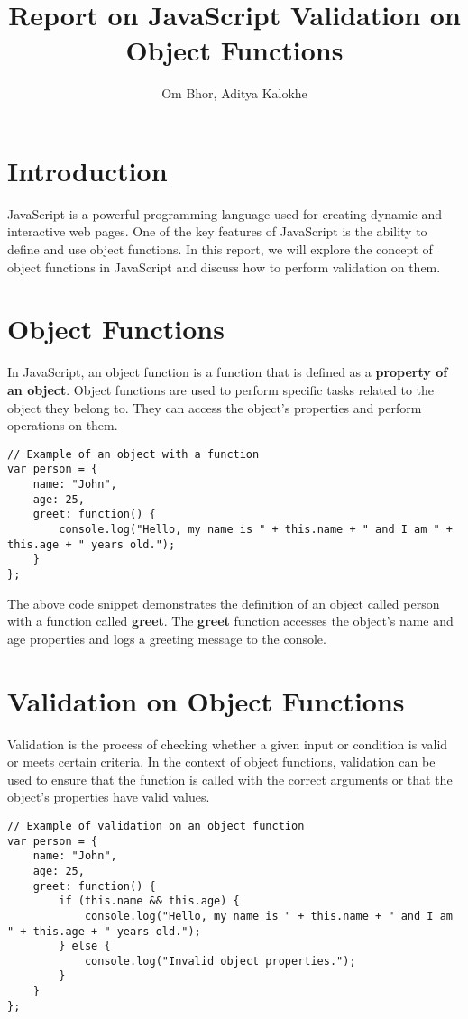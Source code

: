 \documentclass{article}
\title{Report on JavaScript Validation on Object Functions}
\author{Om Bhor, Aditya Kalokhe}
\begin{document}
\maketitle

\section{Introduction}
JavaScript is a powerful programming language used for creating dynamic and interactive web pages. One of the key features of JavaScript is the ability to define and use object functions. In this report, we will explore the concept of object functions in JavaScript and discuss how to perform validation on them.

\section{Object Functions}

In JavaScript, an object function is a function that is defined as a \textbf{property of an object}. Object functions are used to perform specific tasks related to the object they belong to. They can access the object's properties and perform operations on them.

\begin{lstlisting}
// Example of an object with a function
var person = {
    name: "John",
    age: 25,
    greet: function() {
        console.log("Hello, my name is " + this.name + " and I am " + this.age + " years old.");
    }
};
\end{lstlisting}

The above code snippet demonstrates the definition of an object called person with a function called \textbf{greet}. The \textbf{greet} function accesses the object's name and age properties and logs a greeting message to the console.

\section{Validation on Object Functions}

Validation is the process of checking whether a given input or condition is valid or meets certain criteria. In the context of object functions, validation can be used to ensure that the function is called with the correct arguments or that the object's properties have valid values.

\begin{lstlisting}
// Example of validation on an object function
var person = {
    name: "John",
    age: 25,
    greet: function() {
        if (this.name && this.age) {
            console.log("Hello, my name is " + this.name + " and I am " + this.age + " years old.");
        } else {
            console.log("Invalid object properties.");
        }
    }
};
\end{lstlisting}
\end{document}
